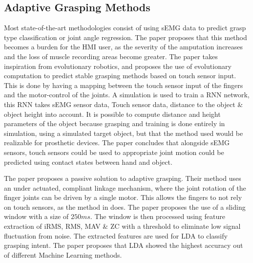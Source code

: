\documentclass[../main.tex]{subfiles}
\begin{document}
\subsection{Adaptive Grasping Methods}
Most state-of-the-art methodologies consist of using sEMG data to predict grasp type classification or joint angle regression.
The paper \cite{Yuki2023} proposes that this method becomes a burden for the HMI user, as the severity of the amputation increases and the loss of muscle recording areas become greater.
The paper takes inspiration from evolutionary robotics, and proposes the use of evolutionary computation to predict stable grasping methods based on touch sensor input.
This is done by having a mapping between the touch sensor input of the fingers and the motor-control of the joints.
A simulation is used to train a \gls{RNN} network, this RNN takes sEMG sensor data, Touch sensor data, distance to the object \& object height into account.
It is possible to compute distance and height parameters of the object because grasping and training is done entirely in simulation, using a simulated target object, but that the method used would be realizable for prosthetic devices. 
The paper concludes that alongside sEMG sensors, touch sensors could be used to appropriate joint motion could be predicted using contact states between hand and object.

The paper \cite{YanchaoWang2022} proposes a passive solution to adaptive grasping.
Their method uses an under actuated, compliant linkage mechanism, where the joint rotation of the finger joints can be driven by a single motor.
This allows the fingers to not rely on touch sensors, as the method in \cite{Yuki2023} does.
The paper proposes the use of a sliding window with a size of $250ms$.
The window is then processed using feature extraction of \gls{iRMS}, \gls{RMS}, \gls{MAV} \& \gls{ZC} with a threshold to eliminate low signal fluctuation from noise.
The extracted features are used for \gls{LDA} to classify grasping intent. 
The paper proposes that LDA showed the highest accuracy out of different Machine Learning methods.
\end{document}
